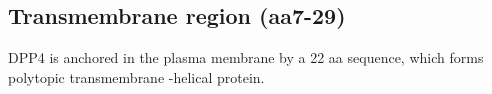 \subsection{Transmembrane region (aa7-29)}

DPP4 is anchored in the plasma membrane by a 22 aa sequence, which forms polytopic transmembrane \alpha-helical protein. \cite{Hong_1990}